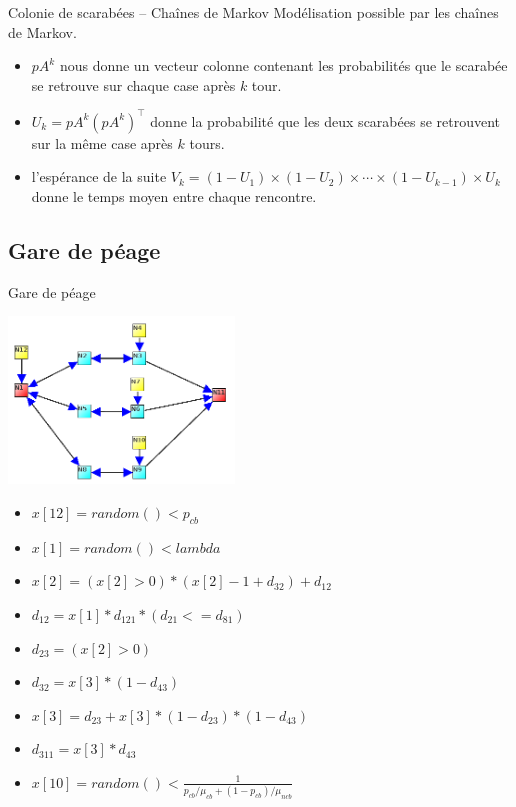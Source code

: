 \documentclass{beamer}
\begin{document}
  \begin{frame}{Colonie de scarabées -- Chaînes de Markov}
    Modélisation possible par les chaînes de Markov.

    \begin{itemize}
        \item $pA^k$ nous donne un vecteur colonne contenant les probabilités que le scarabée
            se retrouve sur chaque case après $k$ tour.
        \item $U_k = pA^k(pA^k)^\intercal$ donne la probabilité que les deux scarabées se retrouvent
            sur la même case après $k$ tours.
        \item l'espérance de la suite $V_k = (1 - U_1) \times (1 - U_2) \times \cdots \times (1 - U_{k - 1}) \times U_k$ donne le temps moyen entre chaque rencontre.
    \end{itemize}
  \end{frame}

\subsection{Gare de péage}
  \begin{frame}{Gare de péage}
    \begin{vwcol}[widths={0.6,0.4}, sep=.0cm, rule=0pt] 
      \includegraphics[width=6cm]{../../procstochs/img/3_files.png}

      \tiny
      \begin{itemize}
        \item $x[12] = random() < p_{cb}$
        \item $x[1] = random() < lambda$
        \item $x[2] =(x[2]>0)*(x[2]-1+d_{32})+d_{12}$
        \item $d_{12} = x[1]*d_{121}*(d_{21}<=d_{81})$
        \item $d_{23} = (x[2]>0)$
        \item $d_{32} = x[3]*(1-d_{43})$
        \item $x[3] = d_{23} + x[3]*(1-d_{23})*(1-d_{43})$
        \item $d_{311} = x[3]*d_{43}$
        \item $x[10] = random() < \frac 1 {p_{cb}/\mu_{cb}+(1-p_{cb})/\mu_{ncb}}$
      \end{itemize}
    \end{vwcol}
  \end{frame}
\end{document}
